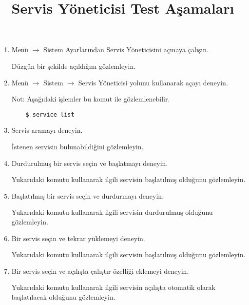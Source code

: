 \documentclass[a4paper,10pt]{article}
\title{Servis Yöneticisi Test Aşamaları}
\begin{document}
\maketitle
\begin{enumerate}
\item Menü $\rightarrow$ Sistem Ayarlarından Servis Yöneticisini açmaya çalışın.
	
	Düzgün bir şekilde açıldığını gözlemleyin.

\item Menü $\rightarrow$ Sistem $\rightarrow$ Servis Yöneticisi yolunu kullanarak açayı deneyin.

Not: Aşağıdaki işlemler bu komut ile gözlemlenebilir. 

\begin{verbatim}
    $ service list
\end{verbatim}

\item Servis aramayı deneyin.

İstenen servisin bulunabildiğini gözlemleyin.

\item Durdurulmuş bir servis seçin ve başlatmayı deneyin.

Yukarıdaki komutu kullanarak ilgili servisin başlatılmış olduğunu gözlemleyin.

\item Başlatılmış bir servis seçin ve durdurmayı deneyin.

Yukarıdaki komutu kullanarak ilgili servisin durdurulmuş olduğunu gözlemleyin.

\item Bir servis seçin ve tekrar yüklemeyi deneyin.

Yukarıdaki komutu kullanarak ilgili servisin başlatılmış olduğunu gözlemleyin.

\item Bir servis seçin ve açılışta çalıştır özelliği eklemeyi deneyin.

Yukarıdaki komutu kullanarak ilgili servisin açılışta otomatik olarak başlatılacak olduğunu gözlemleyin.

\end{enumerate}
\end{document}
